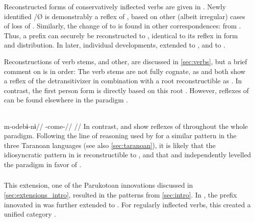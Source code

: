 

Reconstructed \PPek forms of conservatively inflected verbs are given in .
Newly identified \ikpeng {}/Ø is demonstrably a reflex of \PXin {}, based on other (albeit irregular) cases of loss of  .
Similarly, the change of  to \bakairi {} is found in other correspondences:  \parencite{meira2005southern} from \PC {}  \parencite[4]{gildea2007greenberg}.
Thus, a  prefix  can securely be reconstructed to \PPek, identical to its \arara reflex in form and distribution.
In later, individual developments, \bakairi extended  to , and \ikpeng to .



Reconstructions of verb stems, \PPek and other, are discussed in \cref{sec:verbs}, but a brief comment on  is in order:
The verb stems are not fully cognate, as \ikpeng and \bakairi both show a reflex of the \PPek detransitivizer  in combination with a root reconstructible as .
In contrast, the \arara first person form is directly based on this root .
However, reflexes of  can be found elsewhere in the \arara paradigm .

\arara \parencite[][150]{alves2017arara}\\
\begingl
\gla m-odebɨ-nɨ//
\glb {}-come-//
\glft {}//
\endgl
\xe
%
In contrast, \ikpeng and \bakairi show reflexes of  throughout the whole paradigm.
Following the line of reasoning used by \textcite[114]{meira1998proto} for a similar pattern in the three Taranoan languages (see also \cref{sec:taranoan}), it is likely that the idiosyncratic pattern in \arara is reconstructible to \PPek, and that \bakairi and \ikpeng independently levelled the paradigm in favor of .

\subsubsection{\PWai {}}
\label{sec:waiwaian}
This extension, one of the Parukotoan innovations discussed in \cref{sec:extensions_intro}, resulted in the \hixka patterns from \cref{sec:intro}.
In \PWai, the  prefix  innovated in \PPar was further extended to .
For regularly inflected verbs, this created a unified  category .


